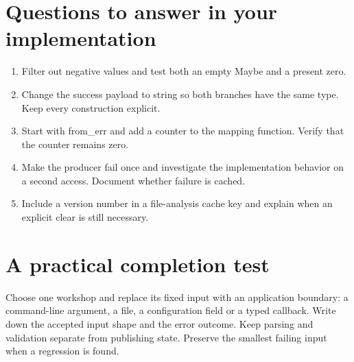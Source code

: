 \section*{Questions to answer in your implementation}
\begin{enumerate}
\item Filter out negative values and test both an empty Maybe and a present zero.
\item Change the success payload to string so both branches have the same type. Keep every construction explicit.
\item Start with from\_err and add a counter to the mapping function. Verify that the counter remains zero.
\item Make the producer fail once and investigate the implementation behavior on a second access. Document whether failure is cached.
\item Include a version number in a file-analysis cache key and explain when an explicit clear is still necessary.
\end{enumerate}
\section*{A practical completion test}
Choose one workshop and replace its fixed input with an application boundary: a command-line argument, a file, a configuration field or a typed callback. Write down the accepted input shape and the error outcome. Keep parsing and validation separate from publishing state. Preserve the smallest failing input when a regression is found.

